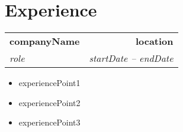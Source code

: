 \documentclass[letterpaper,11pt]{article}
\makeatletter
\newcommand{\resumeItem}[1]{
  \item\small{
    {#1 \vspace{-2pt}}
  }
}
\newcommand{\resumeSubheading}[4]{
  \vspace{-2pt}\item
    \begin{tabular*}{1.0\textwidth}[t]{l@{\extracolsep{\fill}}r}
      \textbf{#1} & \textbf{\small #2} \\
      \textit{\small#3} & \textit{\small #4} \\
    \end{tabular*}\vspace{-7pt}
}
\newcommand{\resumeSubHeadingListStart}{\begin{itemize}[leftmargin=0.0in, label={}]}
\newcommand{\resumeSubHeadingListEnd}{\end{itemize}}
\newcommand{\resumeItemListStart}{\begin{itemize}}
\newcommand{\resumeItemListEnd}{\end{itemize}\vspace{-5pt}}
\makeatother
\begin{document}
\section{Experience}


   
  \resumeSubheading
  { {{companyName}} }{ {{location}} }
  { {{role}} }{ {{startDate}} -- {{endDate}} }
  \resumeItemListStart
    \resumeItem{ {{experiencePoint1}} }
    \resumeItem{ {{experiencePoint2}} }
    \resumeItem{ {{experiencePoint3}} }
  \resumeItemListEnd

\vspace{-16pt}
\end{document}
